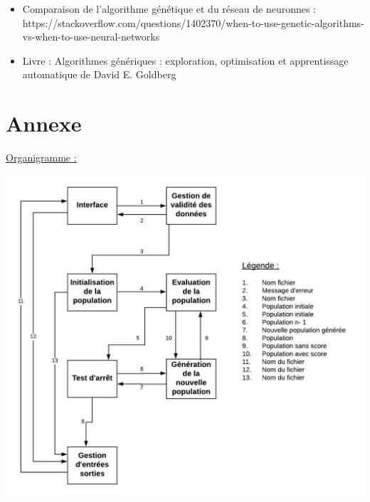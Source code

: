 \documentclass[a4paper,11pt]{article}
\begin{document}
\begin{itemize}
		\item Comparaison de l'algorithme génétique et du réseau de neuronnes :\\
		https://stackoverflow.com/questions/1402370/when-to-use-genetic-algorithms-vs-when-to-use-neural-networks
		
		\item Livre : Algorithmes génériques : exploration, optimisation et apprentissage automatique de David E. Goldberg
		
	\end{itemize}
	
	\newpage
	\section{Annexe}
		\underline{Organigramme :}\\
		\centerline{\includegraphics{OrganigrammeV5.jpeg}}
\end{document}
